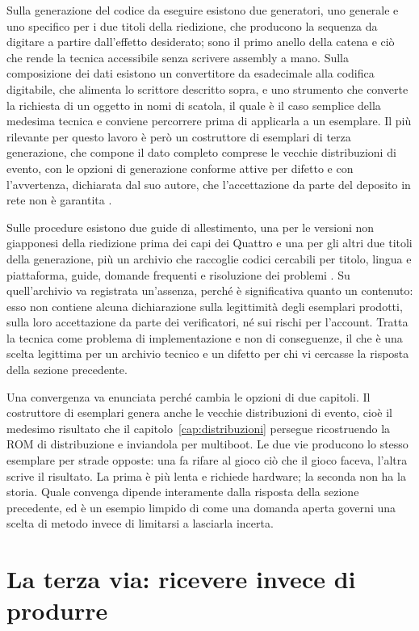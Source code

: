 Sulla generazione del codice da eseguire esistono due generatori, uno generale e uno specifico per i due titoli della riedizione, che producono la sequenza da digitare a partire dall'effetto desiderato; sono il primo anello della catena e ciò che rende la tecnica accessibile senza scrivere assembly a mano. Sulla composizione dei dati esistono un convertitore da esadecimale alla codifica digitabile, che alimenta lo scrittore descritto sopra, e uno strumento che converte la richiesta di un oggetto in nomi di scatola, il quale è il caso semplice della medesima tecnica e conviene percorrere prima di applicarla a un esemplare. Il più rilevante per questo lavoro è però un costruttore di esemplari di terza generazione, che compone il dato completo comprese le vecchie distribuzioni di evento, con le opzioni di generazione conforme attive per difetto e con l'avvertenza, dichiarata dal suo autore, che l'accettazione da parte del deposito in rete non è garantita \cite{gen3-ace-builder}.

Sulle procedure esistono due guide di allestimento, una per le versioni non giapponesi della riedizione prima dei capi dei Quattro e una per gli altri due titoli della generazione, più un archivio che raccoglie codici cercabili per titolo, lingua e piattaforma, guide, domande frequenti e risoluzione dei problemi \cite{ace-archive}. Su quell'archivio va registrata un'assenza, perché è significativa quanto un contenuto: esso non contiene alcuna dichiarazione sulla legittimità degli esemplari prodotti, sulla loro accettazione da parte dei verificatori, né sui rischi per l'account. Tratta la tecnica come problema di implementazione e non di conseguenze, il che è una scelta legittima per un archivio tecnico e un difetto per chi vi cercasse la risposta della sezione precedente.

Una convergenza va enunciata perché cambia le opzioni di due capitoli. Il costruttore di esemplari genera anche le vecchie distribuzioni di evento, cioè il medesimo risultato che il capitolo~\ref{cap:distribuzioni} persegue ricostruendo la ROM di distribuzione e inviandola per multiboot. Le due vie producono lo stesso esemplare per strade opposte: una fa rifare al gioco ciò che il gioco faceva, l'altra scrive il risultato. La prima è più lenta e richiede hardware; la seconda non ha la storia. Quale convenga dipende interamente dalla risposta della sezione precedente, ed è un esempio limpido di come una domanda aperta governi una scelta di metodo invece di limitarsi a lasciarla incerta.

\section{La terza via: ricevere invece di produrre}

